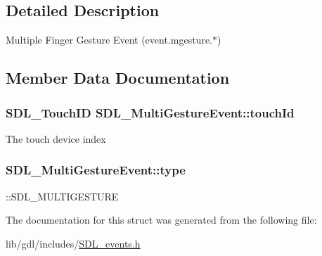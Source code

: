 \subsection{Detailed Description}
Multiple Finger Gesture Event (event.\+mgesture.$\ast$) 

\subsection{Member Data Documentation}
\hypertarget{struct_s_d_l___multi_gesture_event_aa15d1201559a3c9277082af71a972dc1}{}
\subsubsection[{touch\+Id}]{\setlength{\rightskip}{0pt plus 5cm}S\+D\+L\+\_\+\+Touch\+I\+D S\+D\+L\+\_\+\+Multi\+Gesture\+Event\+::touch\+Id}\label{struct_s_d_l___multi_gesture_event_aa15d1201559a3c9277082af71a972dc1}
The touch device index \hypertarget{struct_s_d_l___multi_gesture_event_ab0c7adc9a3f71cc3532bfe0ff8cc6120}{}
\subsubsection[{type}]{ S\+D\+L\+\_\+\+Multi\+Gesture\+Event\+::type}\label{struct_s_d_l___multi_gesture_event_ab0c7adc9a3f71cc3532bfe0ff8cc6120}
\+::\+S\+D\+L\+\_\+\+M\+U\+L\+T\+I\+G\+E\+S\+T\+U\+R\+E 

The documentation for this struct was generated from the following file\+:\begin{DoxyCompactItemize}
\item 
lib/gdl/includes/\hyperlink{_s_d_l__events_8h}{S\+D\+L\+\_\+events.\+h}\end{DoxyCompactItemize}
